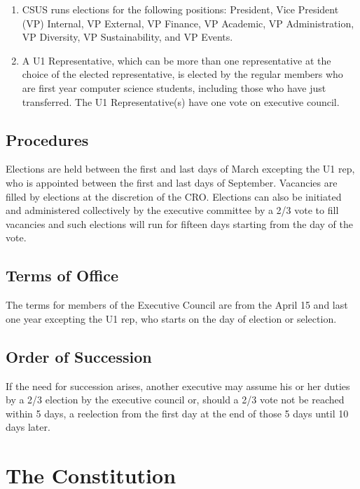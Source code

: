 \begin{enumerate}
\def\labelenumi{\arabic{enumi}.}
\item
  CSUS runs elections for the following positions: President, Vice
  President (VP) Internal, VP External, VP Finance, VP Academic, VP
  Administration, VP Diversity, VP Sustainability, and VP Events.
\item
  A U1 Representative, which can be more than one representative at the
  choice of the elected representative, is elected by the regular
  members who are first year computer science students, including those
  who have just transferred. The U1 Representative(s) have one vote on
  executive council.
\end{enumerate}

\subsection{Procedures}\label{procedures}

Elections are held between the first and last days of March excepting
the U1 rep, who is appointed between the first and last days of
September. Vacancies are filled by elections at the discretion of the
CRO. Elections can also be initiated and administered collectively by
the executive committee by a 2/3 vote to fill vacancies and such
elections will run for fifteen days starting from the day of the vote.

\subsection{Terms of Office}\label{terms-of-office}

The terms for members of the Executive Council are from the April 15 and
last one year excepting the U1 rep, who starts on the day of election or
selection.

\subsection{Order of Succession}\label{order-of-succession}

If the need for succession arises, another executive may assume his or
her duties by a 2/3 election by the executive council or, should a 2/3
vote not be reached within 5 days, a reelection from the first day at
the end of those 5 days until 10 days later.

\section{The Constitution}\label{the-constitution}

